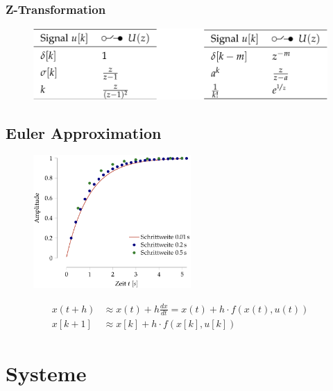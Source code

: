 \documentclass[
  10pt,
  a4paper,
  twocolumn]{article}
\numberwithin{equation}{section}
\begin{document}
\hypertarget{z-transformation-2}{%
\subsubsection{Z-Transformation}\label{z-transformation-2}}

\begin{figure}[H]

{\centering \includegraphics{images/paste-18.png}

}

\end{figure}

\hypertarget{euler-approximation}{%
\subsection{Euler Approximation}\label{euler-approximation}}

\begin{figure}[H]

{\centering \includegraphics[width=6cm,height=\textheight]{images/paste-32.png}

}

\end{figure}

\[
\begin{split}
x(t+h) &\approx x(t) + h\frac{dx}{dt}=x(t)+h\cdot f(x(t),u(t)) \\
x[k+1] &\approx x[k] + h\cdot f(x[k],u[k])
\end{split}
\]

\hypertarget{systeme}{%
\section{Systeme}\label{systeme}}
\end{document}
